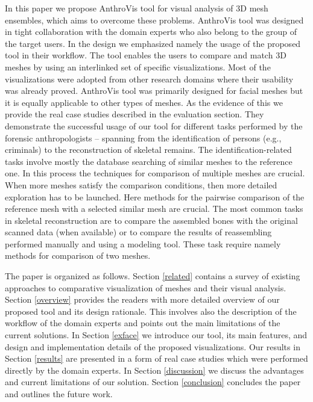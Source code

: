 \documentclass[final,5p,times]{elsarticle}
\begin{document}
In this paper we propose AnthroVis tool for visual analysis of 3D mesh ensembles, which aims to overcome these problems.
AnthroVis tool was designed in tight collaboration with the domain experts who also belong to the group of the target users.
In the design we emphasized namely the usage of the proposed tool in their workflow. 
The tool enables the users to compare and match 3D meshes by using an interlinked set of specific visualizations.
Most of the visualizations were adopted from other research domains where their usability was already proved. 
AnthroVis tool was primarily designed for facial meshes but it is equally applicable to other types of meshes.
As the evidence of this we provide the real case studies described in the evaluation section.
They demonstrate the successful usage of our tool for different tasks performed by the forensic anthropologists -- spanning from the identification of persons (e.g., criminals) to the reconstruction of skeletal remains.
The identification-related tasks involve mostly the database \linebreak[4] searching of similar meshes to the reference one. 
In this process the techniques for comparison of multiple meshes are crucial.
When more meshes satisfy the comparison conditions, then more detailed exploration has to be launched.
Here methods for the pairwise comparison of the reference mesh with a selected similar mesh are crucial.  
The most common tasks in skeletal reconstruction are to compare the assembled bones with the original scanned data (when available) or to compare the results of reassembling performed manually and using a modeling tool.
These task require namely methods for comparison of two meshes.

The paper is organized as follows. 
Section \ref{related} contains a survey of existing approaches to comparative visualization of meshes and their visual analysis.
Section \ref{overview} provides the readers with more detailed overview of our proposed tool and its design rationale.
This involves also the description of the workflow of the domain experts and points out the main limitations of the current solutions.
In Section \ref{exface} we introduce our tool, its main features, and design and implementation details of the proposed visualizations.
Our results in Section \ref{results} are presented in a form of real case studies which were performed directly by the domain experts.
In Section \ref{discussion} we discuss the advantages and current limitations of our solution.
Section \ref{conclusion} concludes the paper and outlines the future work.
\end{document}

